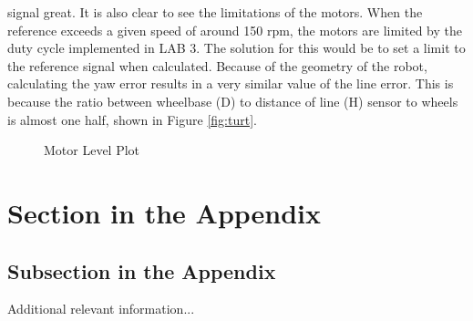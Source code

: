 \documentclass[english]{article}
\begin{document}
signal great. It is also clear to see the limitations of the motors. When the
reference exceeds a given speed of around 150 rpm, the motors are limited by the 
duty cycle implemented in LAB 3. The solution for this would be to set a limit to
the reference signal when calculated. Because of the geometry of the robot,
calculating the yaw error results in a very similar value of the line error.
This is because the ratio between wheelbase (D) to distance of line (H) sensor 
to wheels is almost one half, shown in Figure \ref{fig:turt}. 
\begin{figure}[tbh]
    \centering
    
    \caption{Motor Level Plot}
    \label{fig:datal4}
\end{figure}

\clearpage
\appendix

\section{Section in the Appendix}
\label{sec:app1}

\subsection{Subsection in the Appendix}
\label{subsec:app2}

Additional relevant information...
\end{document}
